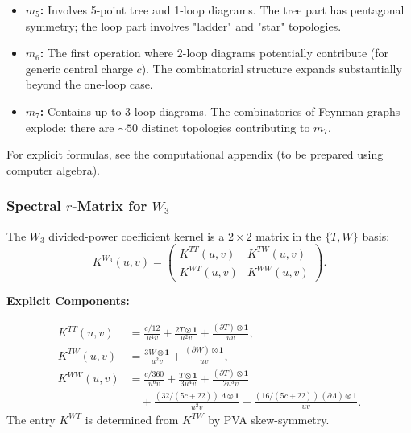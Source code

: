 \begin{itemize}
\item \textbf{$m_5$:} Involves 5-point tree and 1-loop diagrams. The tree part has pentagonal symmetry; the loop part involves "ladder" and "star" topologies.

\item \textbf{$m_6$:} The first operation where 2-loop diagrams potentially contribute (for generic central charge $c$). The combinatorial structure expands substantially beyond the one-loop case.

\item \textbf{$m_7$:} Contains up to 3-loop diagrams. The combinatorics of Feynman graphs explode: there are $\sim 50$ distinct topologies contributing to $m_7$.
\end{itemize}

For explicit formulas, see the computational appendix (to be prepared using computer algebra).

\subsubsection{Spectral $r$-Matrix for $W_3$}

The $W_3$ divided-power coefficient kernel is a $2 \times 2$ matrix in the $\{T, W\}$ basis:
\begin{equation}
K^{W_3}(u, v) = \begin{pmatrix}
K^{TT}(u,v) & K^{TW}(u,v) \\
K^{WT}(u,v) & K^{WW}(u,v)
\end{pmatrix}.
\end{equation}

\textbf{Explicit Components:}

\begin{align}
K^{TT}(u,v) &= \frac{c/12}{u^4 v} + \frac{2T \otimes \mathbf{1}}{u^2 v} + \frac{(\partial T) \otimes \mathbf{1}}{u v},\\
K^{TW}(u,v) &= \frac{3W \otimes \mathbf{1}}{u^2 v} + \frac{(\partial W) \otimes \mathbf{1}}{u v},\\
K^{WW}(u,v) &= \frac{c/360}{u^6 v} + \frac{T \otimes \mathbf{1}}{3u^4 v} + \frac{(\partial T) \otimes \mathbf{1}}{2u^3 v} \\
&\quad + \frac{(32/(5c+22))\,\Lambda \otimes \mathbf{1}}{u^2 v} + \frac{(16/(5c+22))\,(\partial\Lambda) \otimes \mathbf{1}}{u v}.
\end{align}
The entry $K^{WT}$ is determined from $K^{TW}$ by PVA skew-symmetry.

